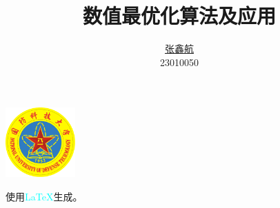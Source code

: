 \documentclass[cn,blue,12pt,normal]{elegantnote}
\title{数值最优化算法及应用}
\author{\href{mailto:zhangxinhang19@foxmail.com}{张鑫航}\\
23010050}
\institute{国防科技大学}
\date{\zhtoday}
\begin{document}
\maketitle
\centerline{
  \includegraphics[width=0.2\textwidth]{figure/logo.pdf}
}
使用\textcolor{cyan}{\LaTeX{}}生成。
\newpage
\tableofcontents
\newpage





\end{document}
